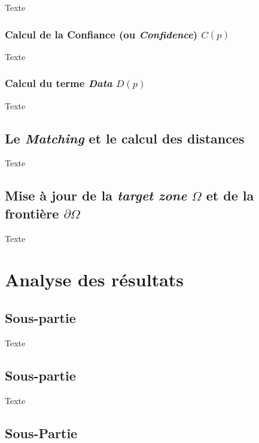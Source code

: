 \documentclass[12pt]{article}
\begin{document}
Texte

\subsubsection{Calcul de la Confiance (ou \textit{Confidence}) $C(p)$}

Texte

\subsubsection{Calcul du terme \textit{Data} $D(p)$}

Texte

\subsection{Le \textit{Matching} et le calcul des distances}

Texte


\subsection{Mise à jour de la \textit{target zone} $\Omega$ et de la 
frontière $\partial\Omega$}

Texte


\newpage
\section{Analyse des résultats}

\subsection{Sous-partie}

Texte

\subsection{Sous-partie}

Texte


\subsection{Sous-Partie}
\end{document}
